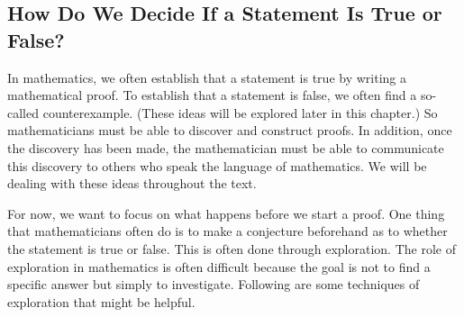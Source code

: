 \subsection*{How Do We Decide If a Statement Is True or False?}\label{SS:true}
In mathematics, we often establish that a statement is true by writing a mathematical proof.  To establish that a statement is false, we often find a so-called counterexample.  (These ideas will be explored later in this chapter.)  So mathematicians must be able to discover and construct proofs.  In addition, once the discovery has been made, the mathematician must be able to communicate this discovery to others who speak the language of mathematics.  We will be dealing with these ideas throughout the text.

For now, we want to focus on what happens  before we start a proof.  One thing that mathematicians often do is to make a conjecture beforehand as to whether the statement is true or false.  This is often done through exploration.  The role of exploration in mathematics is often difficult because the goal is not to find a specific answer but simply to investigate.  Following are some techniques of exploration that might be helpful.
%
%
